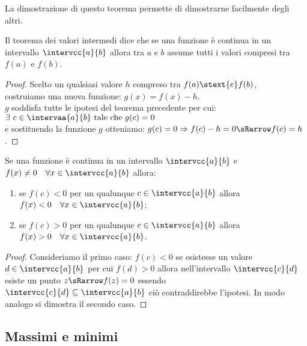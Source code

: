 La dimostrazione di questo teorema permette di dimostrarne facilmente degli 
altri. 

\begin{newcor}{}{}
Il teorema dei valori intermedi dice che se una funzione è continua in un
intervallo \(\intervcc{a}{b}\) allora tra \(a\) e \(b\) assume tutti i 
valori compresi tra \(f(a)\) e \(f(b)\).
\end{newcor}

\begin{proof}
Scelto un qualsiasi valore \(h\) compreso tra \(f(a) \stext{ e } f(b)\), \\
costruiamo una nuova funzione: \quad \(g(x) = f(x)-h\).\\ 
\(g\) soddisfa tutte le ipotesi del teorema precedente per cui: \quad 
\(\exists~c \in \intervaa{a}{b} \text{ tale che } g(c)=0\)\\
e sostituendo la funzione \(g\) otteniamo: \quad 
\(g(c)=0 \Rightarrow f(c) -h=0 \sRarrow f(c)=h\).
\end{proof}

\begin{newcor}{}{}
Se una funzione è continua in un
intervallo \(\intervcc{a}{b}\) e 
\(f(x)\neq 0 \quad \forall x \in \intervcc{a}{b}\) 
allora:
\begin{enumerate}[nosep]
 \item se \(f(c)<0\) \quad per un qualunque \quad \(c \in \intervcc{a}{b}\)
 \quad allora \quad \(f(x)<0 \quad \forall x \in \intervcc{a}{b}\);
 \item se \(f(c)>0\) \quad per un qualunque \quad \(c \in \intervcc{a}{b}\)
 \quad allora \quad \(f(x)>0 \quad \forall x \in \intervcc{a}{b}\).
\end{enumerate}
\end{newcor}

\begin{proof}
Consideriamo il primo caso: \(f(c) < 0\) 
se esistesse un valore \(d \in \intervcc{a}{b}\) per cui
\(f(d) > 0\) allora nell'intervallo \(\intervcc{c}{d}\) 
esiste un punto \(z \sRarrow f(z) = 0\)
essendo \(\intervcc{c}{d} \subseteq \intervcc{a}{b}\) 
ciò contraddirebbe l'ipotesi.
In modo analogo si dimostra il secondo caso.
\end{proof}

\subsection{Massimi e minimi}
\label{subsec:cont_massimiminimi}

